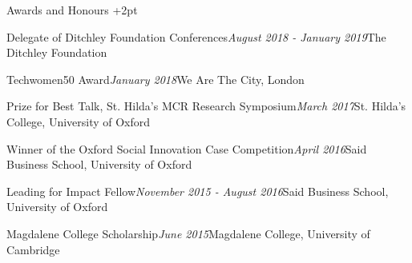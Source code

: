 \documentclass{resume} %
\begin{document}
\begin{rSection}{Awards and Honours}  \itemsep +2pt
\begin{rSubsection}{Delegate of Ditchley Foundation Conferences}{\em August 2018 - January 2019}{The Ditchley Foundation}{}
\item[]\vspace{-1.5\baselineskip}
\end{rSubsection}

\begin{rSubsection}{Techwomen50 Award}{\em January 2018}{We Are The City, London}{}
\item[]\vspace{-1.5\baselineskip}
\end{rSubsection}

\begin{rSubsection}{Prize for Best Talk, St. Hilda’s MCR Research Symposium}{\em March 2017}{St. Hilda’s College, University of Oxford}{}
\item[]\vspace{-1.5\baselineskip}
\end{rSubsection}

\begin{rSubsection}{Winner of the Oxford Social Innovation Case Competition}{\em April 2016}{Said Business School, University of Oxford}{}
\item[]\vspace{-1.5\baselineskip}
\end{rSubsection}

\begin{rSubsection}{Leading for Impact Fellow}{\em November 2015 - August 2016}{Said Business School, University of Oxford}{}
\item[]\vspace{-1.5\baselineskip}
\end{rSubsection}

\begin{rSubsection}{Magdalene College Scholarship}{\em June 2015}{Magdalene College, University of Cambridge}{}
\item[]\vspace{-1.5\baselineskip}
\end{rSubsection}


\end{rSection}
\end{document}
